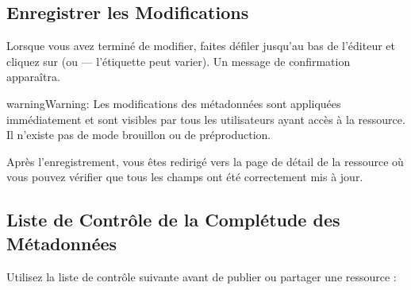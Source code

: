 \documentclass[letterpaper,10pt,english]{sphinxmanual}
\begin{document}
\subsection{Enregistrer les Modifications}
\label{\detokenize{fr/03_gerer_metadonnees:enregistrer-les-modifications}}
\sphinxAtStartPar
Lorsque vous avez terminé de modifier, faites défiler jusqu’au bas de l’éditeur et
cliquez sur  (ou  — l’étiquette peut varier). Un
message de confirmation apparaîtra.

\begin{sphinxadmonition}{warning}{Warning:}
\sphinxAtStartPar
Les modifications des métadonnées sont appliquées immédiatement et sont visibles
par tous les utilisateurs ayant accès à la ressource. Il n’existe pas de mode
brouillon ou de préproduction.
\end{sphinxadmonition}

\sphinxAtStartPar
Après l’enregistrement, vous êtes redirigé vers la page de détail de la ressource
où vous pouvez vérifier que tous les champs ont été correctement mis à jour.


\subsection{Liste de Contrôle de la Complétude des Métadonnées}
\label{\detokenize{fr/03_gerer_metadonnees:liste-de-controle-de-la-completude-des-metadonnees}}
\sphinxAtStartPar
Utilisez la liste de contrôle suivante avant de publier ou partager une ressource :
\end{document}
